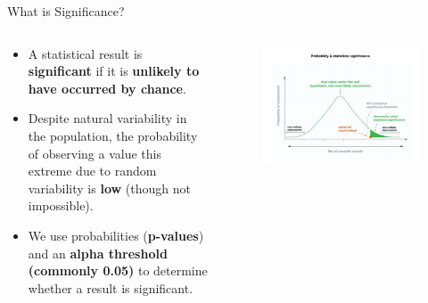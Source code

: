 \documentclass[
  ignorenonframetext,
]{beamer}
\providecommand{\tightlist}{%
  \setlength{\itemsep}{0pt}\setlength{\parskip}{0pt}}
\begin{document}
\begin{frame}{What is Significance?}
\label{what-is-significance}
\begin{columns}[T]
\begin{column}{0.5\textwidth}
\begin{itemize}
\tightlist
\item
  A statistical result is \textbf{significant} if it is \textbf{unlikely
  to have occurred by chance}.
\end{itemize}

\begin{itemize}
\tightlist
\item
  Despite natural variability in the population, the probability of
  observing a value this extreme due to random variability is
  \textbf{low} (though not impossible).
\end{itemize}

\begin{itemize}
\tightlist
\item
  We use probabilities (\textbf{p-values}) and an \textbf{alpha
  threshold (commonly 0.05)} to determine whether a result is
  significant.
\end{itemize}
\end{column}

\begin{column}{0.5\textwidth}
\vspace{1.5cm}
\begin{figure}

{\centering \includegraphics[width=1\linewidth]{figs/plot2} 

}

\end{figure}
\end{column}
\end{columns}
\end{frame}
\end{document}
